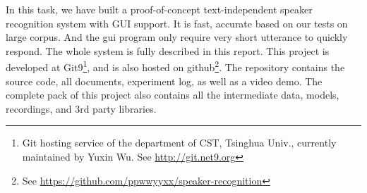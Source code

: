 In this task, we have built a proof-of-concept text-independent speaker recognition system with
GUI support. It is fast, accurate based on our tests on large corpus.
And the gui program only require very short utterance to quickly respond.
The whole system is fully described in this report.
This project is developed at Git9\footnote{Git hosting service of the department of CST, Tsinghua Univ., currently maintained by Yuxin Wu. See
  \url{http://git.net9.org}},
and is also hosted on github\footnote{See \url{https://github.com/ppwwyyxx/speaker-recognition}}.
The repository contains the source code, all documents, experiment log, as well as a video demo.
The complete pack of this project also contains all the intermediate data, models, recordings, and 3rd party libraries.
